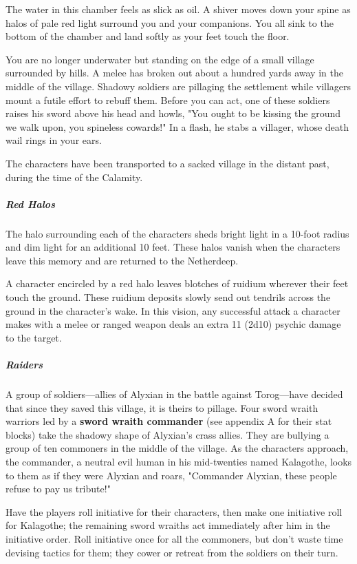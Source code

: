\documentclass[10pt,a4paper,twoside,fancy,bg=print,twocolumn,openany,nodeprecatedcode]{dndbook}
\begin{document}
\begin{DndReadAloud}{}
The water in this chamber feels as slick as oil. A shiver moves down your spine as halos of pale red light surround you and your companions. You all sink to the bottom of the chamber and land softly as your feet touch the floor.

You are no longer underwater but standing on the edge of a small village surrounded by hills. A melee has broken out about a hundred yards away in the middle of the village. Shadowy soldiers are pillaging the settlement while villagers mount a futile effort to rebuff them. Before you can act, one of these soldiers raises his sword above his head and howls, "You ought to be kissing the ground we walk upon, you spineless cowards!" In a flash, he stabs a villager, whose death wail rings in your ears.

\end{DndReadAloud}

The characters have been transported to a sacked village in the distant past, during the time of the Calamity.

\subparagraph{Red Halos}
The halo surrounding each of the characters sheds bright light in a 10-foot radius and dim light for an additional 10 feet. These halos vanish when the characters leave this memory and are returned to the Netherdeep.

A character encircled by a red halo leaves blotches of ruidium wherever their feet touch the ground. These ruidium deposits slowly send out tendrils across the ground in the character's wake. In this vision, any successful attack a character makes with a melee or ranged weapon deals an extra 11 (2d10) psychic damage to the target.

\subparagraph{Raiders}
A group of soldiers—allies of Alyxian in the battle against Torog—have decided that since they saved this village, it is theirs to pillage. Four sword wraith warriors led by a \textbf{sword wraith commander} (see appendix A for their stat blocks) take the shadowy shape of Alyxian's crass allies. They are bullying a group of ten commoners in the middle of the village. As the characters approach, the commander, a neutral evil human in his mid-twenties named Kalagothe, looks to them as if they were Alyxian and roars, "Commander Alyxian, these people refuse to pay us tribute!"

Have the players roll initiative for their characters, then make one initiative roll for Kalagothe; the remaining sword wraiths act immediately after him in the initiative order. Roll initiative once for all the commoners, but don't waste time devising tactics for them; they cower or retreat from the soldiers on their turn.
\end{document}
